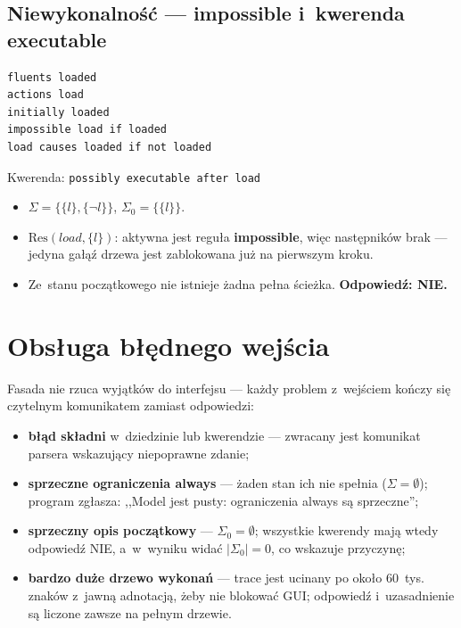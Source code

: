 \documentclass[11pt,a4paper]{article}
\newcommand{\Res}{\mathrm{Res}}
\begin{document}
\subsection{Niewykonalność --- \textbf{impossible} i~kwerenda \textbf{executable}}

\begin{verbatim}
fluents loaded
actions load
initially loaded
impossible load if loaded
load causes loaded if not loaded
\end{verbatim}
Kwerenda: \texttt{possibly executable after load}

\begin{itemize}
  \item $\Sigma = \{\{l\},\{\lnot l\}\}$, $\Sigma_0 = \{\{l\}\}$.
  \item $\Res(\mathit{load}, \{l\})$: aktywna jest reguła
        \textbf{impossible}, więc następników brak --- jedyna gałąź drzewa
        jest zablokowana już na pierwszym kroku.
  \item Ze~stanu początkowego nie istnieje żadna pełna ścieżka.
        \textbf{Odpowiedź: NIE.}
\end{itemize}

\section{Obsługa błędnego wejścia}

Fasada nie rzuca wyjątków do interfejsu --- każdy problem z~wejściem kończy
się czytelnym komunikatem zamiast odpowiedzi:

\begin{itemize}
  \item \textbf{błąd składni} w~dziedzinie lub kwerendzie --- zwracany jest
        komunikat parsera wskazujący niepoprawne zdanie;
  \item \textbf{sprzeczne ograniczenia \textbf{always}} --- żaden stan ich nie
        spełnia ($\Sigma = \emptyset$); program zgłasza: ,,Model jest pusty:
        ograniczenia always są sprzeczne'';
  \item \textbf{sprzeczny opis początkowy} --- $\Sigma_0 = \emptyset$;
        wszystkie kwerendy mają wtedy odpowiedź NIE, a~w~wyniku widać
        $|\Sigma_0| = 0$, co wskazuje przyczynę;
  \item \textbf{bardzo duże drzewo wykonań} --- trace jest ucinany po około
        60~tys. znaków z~jawną adnotacją, żeby nie blokować GUI; odpowiedź
        i~uzasadnienie są liczone zawsze na pełnym drzewie.
\end{itemize}
\end{document}
